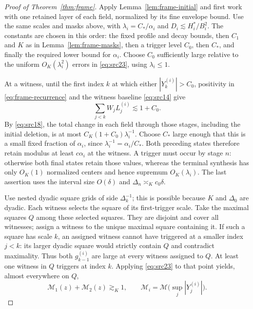 \begin{proof}[Proof of Theorem~\ref{thm:frame}]
Apply Lemma~\ref{lem:frame-initial} and first work with one retained
layer of each field, normalized by its fine envelope bound.  Use the
same scales and masks above, with $\lambda_i=C_*/\alpha_i$ and
$D_i\lesssim H_i^*/B_i^2$.  The constants are chosen in this order:
the fixed profile and decay bounds, then $C_1$ and $K$ as in
Lemma~\ref{lem:frame-masks}, then a trigger level $C_0$, then $C_*$,
and finally the required lower bound for $\alpha_i$.
Choose $C_0$ sufficiently large relative to the uniform
$O_K(\lambda_i^2)$ errors in \eqref{eq:src23}, using
$\lambda_i\leq1$.

At a witness, until the first index $k$ at which either
$|Y_k^{(i)}|>C_0$, positivity in \eqref{eq:frame-recurrence} and
the witness baseline \eqref{eq:src14} give
\[
 \sum_{j<k}W_jL_j^{(i)}\lesssim1+C_0.
\]
By \eqref{eq:src18}, the total change in each field through those
stages, including the initial deletion, is at most
$C_K(1+C_0)\lambda_i^{-1}$.
Choose $C_*$ large enough that this is a small fixed fraction of
$\alpha_i$, since $\lambda_i^{-1}=\alpha_i/C_*$.
Both preceding states therefore retain modulus at least
$c\alpha_i$ at the witness.  A trigger must occur by stage $n$:
otherwise both final states retain those values, whereas the terminal
synthesis has only $O_K(1)$ normalized centers and hence supremum
$O_K(\lambda_i)$.  The last assertion uses the interval size
$O(\delta)$ and $\Delta_n\asymp_K c_0\delta$.

Use nested dyadic square grids of side $\Delta_k^{-1}$; this is
possible because $K$ and $\Delta_0$ are dyadic.  Each witness selects
the square of its first-trigger scale.  Take the maximal squares
$Q$ among these selected squares.  They are disjoint and cover all
witnesses; assign a witness to the unique maximal square containing
it.  If such a square has scale $k$, an assigned witness cannot have
triggered at a smaller index $j<k$: its larger dyadic square would
strictly contain $Q$ and contradict maximality.  Thus both
$g_{k-1}^{(i)}$ are large at every witness assigned to $Q$.
At least one witness in $Q$ triggers at index $k$.  Applying
\eqref{eq:src23} to that point yields, almost everywhere on $Q$,
\begin{equation}\label{eq:frame-trigger-maximal}
 \mathcal M_1(z)+\mathcal M_2(z)\gtrsim_K1,
 \qquad
 \mathcal M_i=\mathcal M\bigl(\sup_j|Y_j^{(i)}|\bigr).
\end{equation}


\end{proof}
